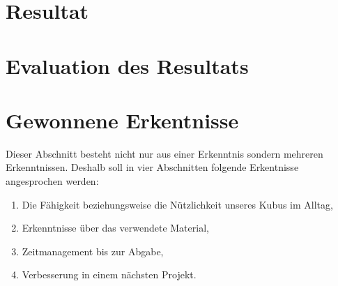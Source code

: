 \documentclass{article}
\begin{document}
\section{Resultat}

\section{Evaluation des Resultats}

\section{Gewonnene Erkentnisse}
Dieser Abschnitt besteht nicht nur aus einer Erkenntnis sondern mehreren Erkenntnissen. Deshalb soll in vier Abschnitten folgende Erkentnisse angesprochen werden: 
\begin{enumerate}
\item Die Fähigkeit beziehungsweise die Nützlichkeit unseres Kubus im Alltag,
\item Erkenntnisse über das verwendete Material,
\item Zeitmanagement bis zur Abgabe,
\item Verbesserung in einem nächsten Projekt.
\end{enumerate}
\end{document}
